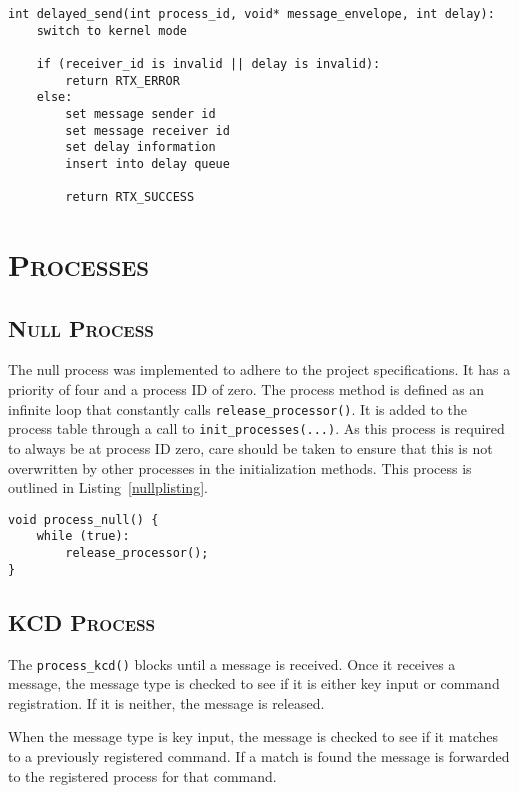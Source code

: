 \documentclass[oneside]{report}
\begin{document}
\begin{lstlisting}
int delayed_send(int process_id, void* message_envelope, int delay):
    switch to kernel mode

    if (receiver_id is invalid || delay is invalid):
        return RTX_ERROR
    else:
        set message sender id
        set message receiver id
        set delay information
        insert into delay queue

        return RTX_SUCCESS
\end{lstlisting}



\section{\textsc{Processes}}
\subsection{\textsc{Null Process}}
The null process was implemented to adhere to the project specifications. It
has a priority of four and a process ID of zero. The process method is defined 
as an infinite loop that constantly calls \texttt{release\_processor()}. It is 
added to the process table through a call to \texttt{init\_processes(...)}. As
this process is required to always be at process ID zero, care should be taken
to ensure that this is not overwritten by other processes in the initialization
methods. This process is outlined in Listing~\ref{nullplisting}.

\begin{lstlisting}
void process_null() {
    while (true):
        release_processor();
}
\end{lstlisting}

\subsection{\textsc{KCD Process}}
The \texttt{process\_kcd()} blocks until a message is received. Once it
receives a message, the message type is checked to see if it is either
key input or command registration. If it is neither, the message is
released. 

When the message type is key input, the message is checked to see if
it matches to a previously registered command. If a match is found the
message is forwarded to the registered process for that command.
\end{document}
